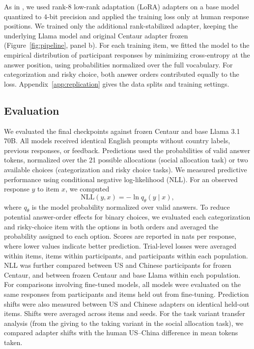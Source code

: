 As in \citet{binz2025centaur}, we used rank-8 low-rank adaptation (LoRA) adapters on a base model quantized to 4-bit precision and applied the training loss only at human response positions. We trained only the additional rank-stabilized adapter, keeping the underlying Llama model and original Centaur adapter frozen (Figure~\ref{fig:pipeline}, panel b). For each training item, we fitted the model to the empirical distribution of participant responses by minimizing cross-entropy at the answer position, using probabilities normalized over the full vocabulary. For categorization and risky choice, both answer orders contributed equally to the loss. Appendix~\ref{app:replication} gives the data splits and training settings.

\subsection{Evaluation}

We evaluated the final checkpoints against frozen Centaur and base Llama 3.1 70B. All models received identical English prompts without country labels, previous responses, or feedback. Predictions used the probabilities of valid answer tokens, normalized over the 21 possible allocations (social allocation task) or two available choices (categorization and risky choice tasks). We measured predictive performance using conditional negative log-likelihood (NLL). For an observed response $y$ to item $x$, we computed
\[
\mathrm{NLL}(y,x) = -\ln q_{\theta}(y \mid x),
\]
where $q_{\theta}$ is the model probability normalized over valid
answers. To reduce potential answer-order effects for binary choices, we evaluated each categorization and risky-choice item with the options in both orders and averaged the probability assigned to each option. Scores are reported in nats per response, where lower values indicate better prediction. Trial-level losses were averaged within items, items within participants, and participants within each population.
NLL was further compared between US and Chinese participants for frozen Centaur, and between frozen Centaur and base Llama within each population. For comparisons involving fine-tuned models, all models were evaluated on the same responses from participants and items held out from fine-tuning. Prediction shifts were also measured between US and Chinese adapters on identical held-out items. Shifts were averaged across items and seeds. For the task variant transfer analysis (from the giving to the taking variant in the social allocation task), we compared adapter shifts with the human US--China difference in mean tokens taken.

